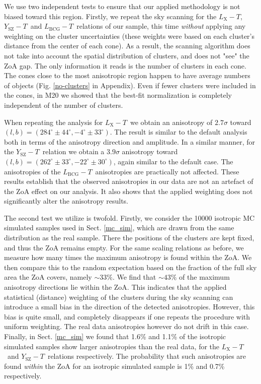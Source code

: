 \documentclass{aa}   %
\newcommand{\LT}{$L_{\text{X}}-T$}
\newcommand{\YT}{$Y_{\text{SZ}}-T$}
\newcommand{\LbcgT}{$L_{\text{BCG}}-T$}
\begin{document}
We use two independent tests to ensure that our applied methodology is not biased toward this region. Firstly, we repeat the sky scanning for the \LT, \YT\, and \LbcgT\ relations of our sample, this time \emph{without} applying any weighting on the cluster uncertainties (these weights were based on each cluster's distance from the center of each cone). As a result, the scanning algorithm does not take into account the spatial distribution of clusters, and does not "see" the ZoA gap. The only information it reads is the number of clusters in each cone. The cones close to the most anisotropic region happen to have average numbers of objects (Fig. \ref{no-clusters} in Appendix). Even if fewer clusters were included in the cones, in M20 we showed that the best-fit normalization is completely independent of the number of clusters. 

When repeating the analysis for \LT\, we obtain an anisotropy of $2.7\sigma$ toward $(l,b)=(284^{\circ}\pm 44^{\circ},-4^{\circ}\pm 33^{\circ})$. The result is similar to the default analysis both in terms of the anisotropy direction and amplitude. In a similar manner, for the \YT\ relation we obtain a $3.9\sigma$ anisotropy toward $(l,b)=(262^{\circ}\pm 33^{\circ} ,-22^{\circ}\pm 30^{\circ})$, again similar to the default case. The anisotropies of the \LbcgT\ anisotropies are practically not affected. These results establish that the observed anisotropies in our data are not an artefact of the ZoA effect on our analysis. It also shows that the applied weighting does not significantly alter the anisotropy results. 

The second test we utilize is twofold. Firstly, we consider the 10000 isotropic MC simulated samples used in Sect. \ref{mc_sim}, which are drawn from the same distribution as the real sample. There the positions of the clusters are kept fixed, and thus the ZoA remains empty. For the same scaling relations as before, we measure how many times the maximum anisotropy is found within the ZoA. We then compare this to the random expectation based on the fraction of the full sky area the ZoA covers, namely $\sim 33\%$. We find that $\sim 43\%$ of the maximum anisotropy directions lie within the ZoA. This indicates that the applied statistical (distance) weighting of the clusters during the sky scanning can introduce a small bias in the direction of the detected anisotropies. However, this bias is quite small, and completely disappears if one repeats the procedure with uniform weighting. The real data anisotropies however do not drift in this case. Finally, in Sect. \ref{mc_sim} we found that 1.6\% and 1.1\% of the isotropic simulated samples show larger anisotropies than the real data, for the \LT\ and \YT\ relations respectively. The probability that such anisotropies are found \emph{within} the ZoA for an isotropic simulated sample is 1\% and 0.7\% respectively.
\end{document}
